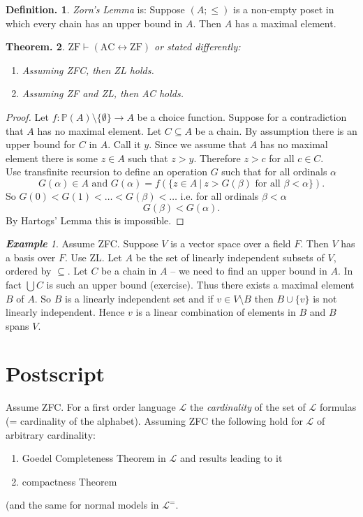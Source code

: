 \documentclass[a4paper,oneside,11pt,DIV=12,parskip=half]{scrartcl}
\newcommand{\LL}{\mathcal L}
\theoremstyle{plain}
\newtheorem{theorem}{Theorem.}[section]
\theoremstyle{definition}
\newtheorem{definition}[theorem]{Definition.}
\newtheorem{remark, definition}[theorem]{Remark and Definition.}
\newtheorem{lemma, definition}[theorem]{Lemma and Definition.}
\newtheorem{theorem, definition}[theorem]{Theorem and Definition.}
\theoremstyle{remark}
\newtheorem*{example}{\textbf{Example}}
\newtheorem*{remark, example}{\textbf{Remark and Exercise}}
\begin{document}
\begin{definition}
\emph{Zorn's Lemma} is:
Suppose $(A;\leq)$ is a non-empty poset in which every chain has an upper bound in $A$. Then $A$ has a maximal element.
\end{definition}

\begin{theorem}\label{Th:AC=ZL}
$\mathrm{ZF} \vdash (\mathrm{AC} \leftrightarrow \mathrm{ZF})$ or stated differently:
\begin{enumerate}
    \item Assuming ZFC, then ZL holds.
    \item Assuming ZF and ZL, then AC holds.
\end{enumerate}
\end{theorem}

\begin{proof}
Let $f: \mathbb{P}(A) \setminus\{\emptyset\} \rightarrow A$ be a choice function. Suppose for a contradiction that $A$ has no maximal element. Let $C \subseteq A$ be a chain. By assumption there is an upper bound for $C$ in $A$. Call it $y$. Since we assume that $A$ has no maximal element there is some $z \in A$ such that $z > y$. Therefore $z > c$ for all $c \in C$. \\
Use transfinite recursion to define an operation $G$ such that for all ordinals $\alpha$
\[ G(\alpha) \in A \text{ and } G(\alpha) = f(\{z \in A ~|~ z > G(\beta) \text{ for all  } \beta < \alpha \}). \]
So $G(0) < G(1) < \dots < G(\beta) < \dots$ i.e. for all ordinals $\beta < \alpha$ 
    \[ G(\beta) < G(\alpha). \]
By Hartogs' Lemma this is impossible.
\end{proof}

\begin{example}
Assume ZFC. Suppose $V$ is a vector space over a field $F$. Then $V$ has a basis over $F$. Use ZL.
Let $A$ be the set of linearly independent subsets of $V$, ordered by $\subseteq$.
Let $C$  be a chain in $A$ -- we need to find an upper bound in $A$. In fact $\bigcup C$ is such an upper bound (exercise). Thus there exists a maximal element $B$ of $A$. So $B$ is a linearly independent set and if $v \in V \setminus B$ then $B \cup \{v\}$ is not linearly independent. Hence $v$ is a linear combination of elements in $B$ and $B$ spans $V$.
\end{example}

\section{Postscript}

Assume ZFC. For a first order language $\LL$ the \emph{cardinality} of the set of $\LL$ formulas (= cardinality of the alphabet).
Assuming ZFC the following hold for $\LL$ of arbitrary cardinality:
\begin{enumerate}
    \item Goedel Completeness Theorem in $\LL$ and results leading to it
    \item compactness Theorem
\end{enumerate}
(and the same for normal models in $\LL^=$.
\end{document}

